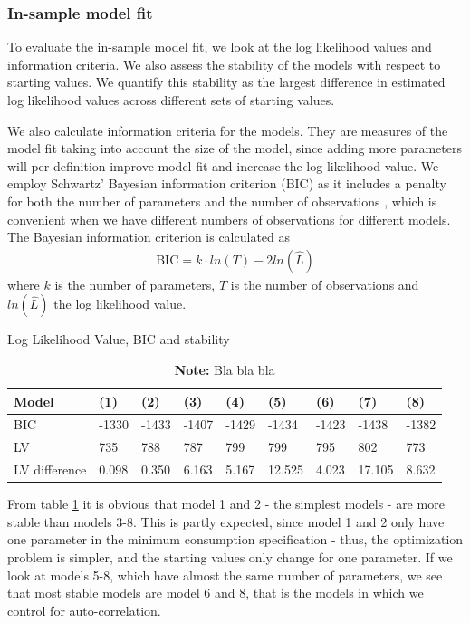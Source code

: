 \subsubsection{In-sample model fit}
To evaluate the in-sample model fit, we look at the log likelihood values and information criteria. We also assess the stability of the models with respect to starting values. We quantify this stability as the largest difference in estimated log likelihood values across different sets of starting values. 

We also calculate information criteria for the models. They are measures of the model fit taking into account the size of the model, since adding more parameters will per definition improve model fit and increase the log likelihood value. We employ Schwartz' Bayesian information criterion (BIC) as it includes a penalty for both the number of parameters and the number of observations \citep{lutkepohl2005new}, which is convenient when we have different numbers of observations for different models.
The Bayesian information criterion is calculated as
\begin{align}
    \text{BIC} = k \cdot ln (T) - 2  ln(\hat{L})
\end{align}
where $k$ is the number of parameters, $T$ is the number of observations and $ln(\hat{L})$ the log likelihood value.

\begin{table}[H]
\centering
\caption{Log Likelihood Value, BIC and stability}
\label{tableLV}
\begin{tabular}{lllllllll} \hline
Model         & (1)      & (2)      & (3)      & (4)      & (5)      & (6)      & (7)      & (8)      \\ \hline
BIC           & -1330 & -1433 & -1407 & -1429 & -1434 & -1423 & -1438 & -1382 \\
LV            & 735 & 788 & 787 & 799  & 799 & 795 & 802 & 773\\
LV difference & 0.098    & 0.350    & 6.163    & 5.167    & 12.525   & 4.023    & 17.105   & 8.632  \\ \hline
\end{tabular}
\captionsetup{singlelinecheck=off,size=scriptsize}
\setlength{\captionmargin}{10pt}
\caption*{
\textbf{Note:} Bla bla bla}
\end{table}
From table \ref{tableLV} it is obvious that model 1 and 2 - the simplest models - are more stable than models 3-8. This is partly expected, since model 1 and 2 only have one parameter in the minimum consumption specification - thus, the optimization problem is simpler, and the starting values only change for one parameter. If we look at models 5-8, which have almost the same number of parameters, we see that most stable models are model 6 and 8, that is the models in which we control for auto-correlation.


